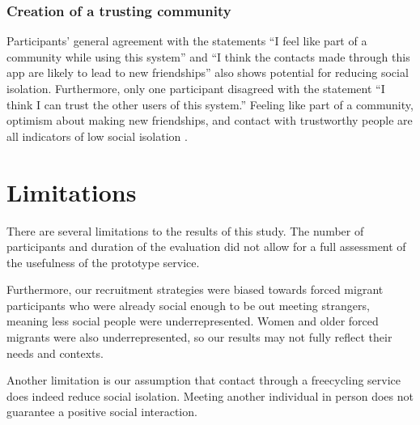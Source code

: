 \subsubsection*{Creation of a trusting community}

Participants' general agreement with the statements ``I feel like part of a community while using this system'' and ``I think the contacts made through this app are likely to lead to new friendships'' also shows potential for reducing social isolation. Furthermore, only one participant disagreed with the statement ``I think I can trust the other users of this system.'' Feeling like part of a community, optimism about making new friendships, and contact with trustworthy people are all indicators of low social isolation \cite{cornwell_measuring_2009}.




\section{Limitations}

There are several limitations to the results of this study. The number of participants and duration of the evaluation did not allow for a full assessment of the usefulness of the prototype service.

Furthermore, our recruitment strategies were biased towards forced migrant participants who were already social enough to be out meeting strangers, meaning less social people were underrepresented. Women and older forced migrants were also underrepresented, so our results may not fully reflect their needs and contexts.

Another limitation is our assumption that contact through a freecycling service does indeed reduce social isolation. Meeting another individual in person does not guarantee a positive social interaction.

